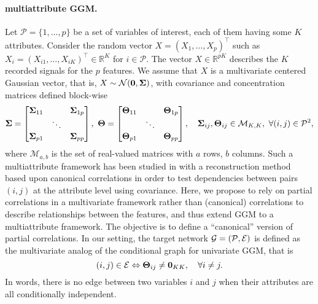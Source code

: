 \paragraph*{multiattribute GGM.}   Let $\mathcal{P}=\{1,\dots,p\}$ be
a  set  of  variables  of  interest, each  of  them  having  some  $K$
attributes.    Consider  the   random   vector  $X   =  (X_1,   \dots,
X_p)^\intercal$  such  as  $X_i  =(X_{i1},\dots,X_{iK})^\intercal  \in
\mathbb{R}^K$ for $i\in\mathcal{P}$. The vector $X\in \mathbb{R}^{pK}$
describes the  $K$ recorded signals  for the $p$ features.   We assume
that $X$ is a multivariate centered  Gaussian vector, that is, $X \sim
\mathcal{N}(\mathbf{0}, {\boldsymbol\Sigma})$,  with covariance  and concentration
matrices defined block-wise
\[
{\boldsymbol\Sigma} = \begin{bmatrix}
  {\boldsymbol\Sigma}_{11} & & {\boldsymbol\Sigma}_{1p} \\
  & \ddots & \\
  {\boldsymbol\Sigma}_{p1} & & {\boldsymbol\Sigma}_{pp} \\
\end{bmatrix}, \ \boldsymbol\Theta = \begin{bmatrix}
  \boldsymbol\Theta_{11} & & \boldsymbol\Theta_{1p} \\
  & \ddots & \\
  \boldsymbol\Theta_{p1} & & \boldsymbol\Theta_{pp} \\
\end{bmatrix}, \quad {\boldsymbol\Sigma}_{ij}, \boldsymbol\Theta_{ij}\in \mathcal{M}_{K,K},
\ \forall (i,j)\in\mathcal{P}^2,
\]
where $\mathcal{M}_{a,b}$ is the set  of real-valued matrices with $a$
rows, $b$ columns.   Such a multiattribute framework  has been studied
in \cite{katenka2012inference} with a reconstruction method based upon
canonical  correlations in  order to  test dependencies  between pairs
$(i,j)$ at the attribute level  using covariance.  Here, we propose to
rely on partial  correlations in a multivariate  framework rather than
(canonical)  correlations   to  describe  relationships   between  the
features, and  thus extend  GGM to  a multiattribute  framework.  The
objective   is  to   define   a  ``canonical''   version  of   partial
correlations.      In    our     setting,    the     target    network
$\mathcal{G}=(\mathcal{P},\mathcal{E})$  is  defined  as  the  multivariate
analog of the conditional graph for univariate GGM, that is
\begin{equation}
  \label{eq:multi_net}
  (i,j)  \in  \mathcal{E}  \Leftrightarrow \invcov_{ij}  \neq  \bzr_{KK},
  \quad \forall i\neq j.
\end{equation}
In words,  there is  no edge  between two variables  $i$ and  $j$ when
their attributes are all conditionally independent.

